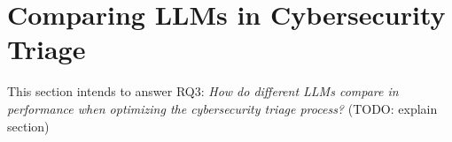 \section{Comparing LLMs in Cybersecurity Triage}
\label{sec:rq3}

This section intends to answer RQ3:
\textit{How do different LLMs compare in performance when optimizing the cybersecurity triage process?}
(TODO: explain section) %

